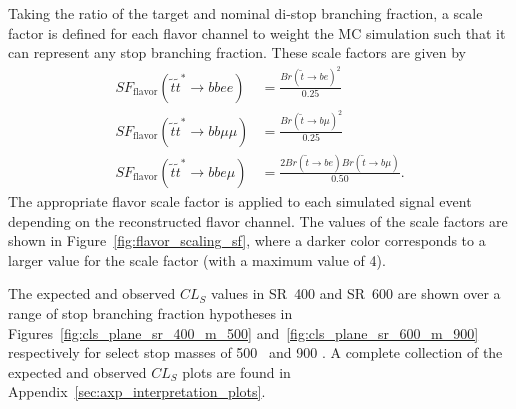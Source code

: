 Taking the ratio of the target and nominal di-stop branching fraction, a
scale factor is defined for each flavor channel to weight the MC simulation
such that it can represent any stop branching fraction.
These scale factors are given by
\begin{equation}
  \label{eqn:flavor_scale_factor}
  \begin{aligned}
    SF_\mathrm{flavor}(\tilde{t}\tilde{t}^{*} \rightarrow bbee)     &=
      \frac{Br(\tilde{t} \rightarrow be)^2}{0.25} \\
    SF_\mathrm{flavor}(\tilde{t}\tilde{t}^{*} \rightarrow bb\mu\mu) &=
      \frac{Br(\tilde{t} \rightarrow b\mu)^2}{0.25} \\
    SF_\mathrm{flavor}(\tilde{t}\tilde{t}^{*} \rightarrow bbe\mu)   &=
      \frac{2Br(\tilde{t} \rightarrow be)Br(\tilde{t} \rightarrow b\mu)}{0.50}.
  \end{aligned}
\end{equation}
The appropriate flavor scale factor is applied to each simulated signal event
depending on the reconstructed flavor channel.
The values of the scale factors are shown in Figure~\ref{fig:flavor_scaling_sf},
where a darker color corresponds to a larger value for the scale factor (with a
maximum value of 4).

The expected and observed $CL_S$ values in SR~400 and SR~600 are shown
over a range of stop branching fraction hypotheses in
Figures~\ref{fig:cls_plane_sr_400_m_500} and~\ref{fig:cls_plane_sr_600_m_900}
respectively for select stop masses of 500 \GeV\ and 900 \GeV.
A complete collection of the expected and observed $CL_S$ plots are found in
Appendix~\ref{sec:axp_interpretation_plots}.

